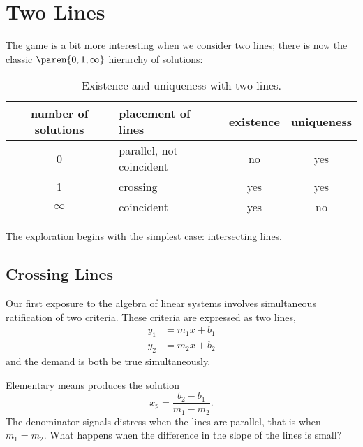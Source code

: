 \section{Two Lines}  %
The game is a bit more interesting when we consider two lines; there is now the classic $\paren{0,1,\infty}$ hierarchy of solutions:
  \begin{table}[htbp]  %
    \caption{Existence and uniqueness with two lines.}
    \begin{center}
      \begin{tabular}{clcc}
        number of solutions & placement of lines & existence & uniqueness \\\hline
        0 & parallel, not coincident  & no & yes \\
        1 & crossing & yes & yes \\
        $\infty$ & coincident & yes & no
      \end{tabular}
    \end{center}
  \end{table}%

The exploration begins with the simplest case: intersecting lines.

\subsection{Crossing Lines}  %
Our first exposure to the algebra of linear systems involves simultaneous ratification of two criteria. These criteria are expressed as two lines,
  \begin{equation*}   %
    \begin{split}
      y_{1} &= m_{1}x + b_{1} \\
      y_{2} &= m_{2}x + b_{2}
    \end{split}
  \end{equation*}
and the demand is both be true simultaneously.

Elementary means produces the solution
  \begin{equation}   %
    x_{p} = \frac{b_{2} - b_{1}} {m_{1} - m_{2}}.
    \label{eq:crossing}
  \end{equation}
The denominator signals distress when the lines are parallel, that is when $m_{1} = m_{2}$. What happens when the difference in the slope of the lines is small?

